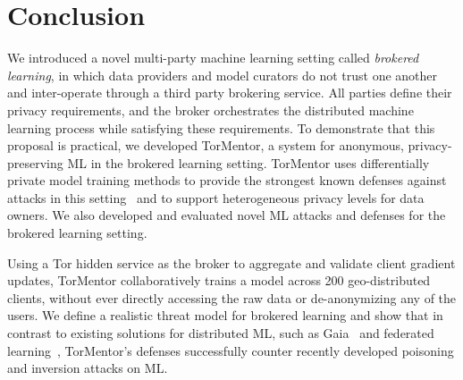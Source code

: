 \chapter{Conclusion}
\label{sec:conc}

We introduced a novel multi-party machine learning setting called
\textit{brokered learning}, in which data providers and model curators
do not trust one another and inter-operate through a third party
brokering service. All parties define their privacy requirements, and
the broker orchestrates the distributed machine learning process
while satisfying these requirements.
To demonstrate that this proposal is practical, we developed
TorMentor, a system for anonymous, privacy-preserving ML in the
brokered learning setting. TorMentor uses differentially private
model training methods to provide the strongest known defenses against
attacks in this setting~\cite{Huang:2011} and to support heterogeneous
privacy levels for data owners. We also developed and evaluated novel
ML attacks and defenses for the brokered learning setting.

Using a Tor hidden service as the broker to aggregate and validate client
gradient updates, TorMentor collaboratively trains a model across 200
geo-distributed clients, without ever directly accessing the raw data
or de-anonymizing any of the users. We define a realistic
threat model for brokered learning and show that in contrast to existing
solutions for distributed ML, such as Gaia~\cite{Hsieh:2017} and
federated learning~\cite{McMahan:2017}, TorMentor's defenses
successfully counter recently developed poisoning and inversion attacks
on ML. 


